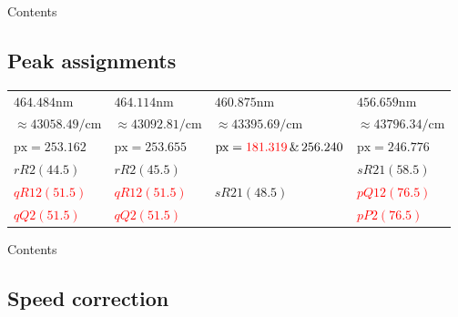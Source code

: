 \documentclass[aspectratio=43,scheme=plain]{ctexbeamer}
\begin{document}
\begin{frame}{Contents}
\end{frame}
\subsection{Peak assignments}
\begin{frame}{\insertsubsection}
			\begin{table}
			\centering  	 
			\scriptsize
			\begin{tabularx}{0.97\textwidth}{llll}    
				\toprule   
				$464.484 \unit{\nano \meter}$ &$464.114\unit{\nano \meter}$&$460.875 \unit{\nano \meter}$& $456.659 \unit{\nano \meter}$\\
				$\approx43058.49 \unit{\per \centi \meter}$ &   $\approx43092.81\unit{\per \centi \meter}$ &  $\approx 43395.69\unit{\per \centi \meter}$ & $\approx 43796.34\unit{\per \centi \meter} $\\
				\midrule   
				$\text{px}=253.162$ & $\text{px}=253.655$ & $\text{px}=\textcolor{red}{181.319}\,\&\,256.240$ &$ \text{px}=246.776$ \\  
				\midrule 
				$rR2\left( 44.5\right) $ & $rR2\left( 45.5\right) $ &  &$sR21\left( 58.5\right) $\\  
				\textcolor{red}{$qR12\left( 51.5\right) $} & \textcolor{red}{$qR12 \left( 51.5\right) $} &  $sR21\left( 48.5\right) $ & \textcolor{red}{$pQ12 \left( 76.5\right) $} \\ 
				\textcolor{red}{$qQ2\left(  51.5\right) $} & \textcolor{red}{$qQ2\left(  51.5\right) $} &   & \textcolor{red}{$pP2\left(  76.5\right) $} \\ 
				\bottomrule    
			\end{tabularx}%
		\end{table}%
	\end{frame}
	\begin{frame}{Contents}
	\end{frame}
	\subsection{Speed correction}
\end{document}
